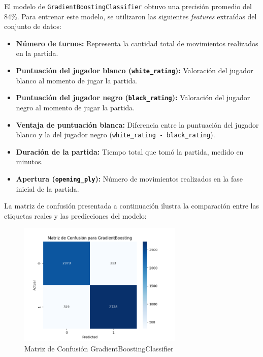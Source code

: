 \documentclass[a4paper,12pt]{article}
\begin{document}
El modelo de \texttt{GradientBoostingClassifier} obtuvo una precisión promedio del 84\%. Para entrenar este modelo, se utilizaron las siguientes \textit{features} extraídas del conjunto de datos:

\begin{itemize}
    \item \textbf{Número de turnos:} Representa la cantidad total de movimientos realizados en la partida.
    \item \textbf{Puntuación del jugador blanco (\texttt{white\_rating}):} Valoración del jugador blanco al momento de jugar la partida.
    \item \textbf{Puntuación del jugador negro (\texttt{black\_rating}):} Valoración del jugador negro al momento de jugar la partida.
    \item \textbf{Ventaja de puntuación blanca:} Diferencia entre la puntuación del jugador blanco y la del jugador negro (\texttt{white\_rating - black\_rating}).
    \item \textbf{Duración de la partida:} Tiempo total que tomó la partida, medido en minutos.
    \item \textbf{Apertura (\texttt{opening\_ply}):} Número de movimientos realizados en la fase inicial de la partida.
\end{itemize}

La matriz de confusión presentada a continuación ilustra la comparación entre las etiquetas reales y las predicciones del modelo:

\vspace{10pt} %
\begin{figure}[H]
    \centering
    \includegraphics[width=0.7\textwidth]{../images/Figure_1_GB.png}
    \caption{Matriz de Confusión GradientBoostingClassifier}
    \label{fig:GradientBoostingClassifier}
\end{figure}
\end{document}
